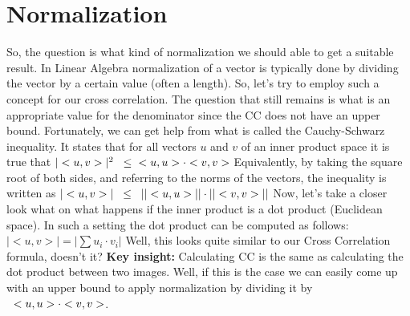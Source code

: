 \documentclass{article}
\begin{document}
\section{Normalization}
So, the question is what kind of normalization we should able to get a suitable result. In Linear Algebra normalization of a vector is typically done by dividing the vector by a certain value (often a length). So, let's try to employ such a concept for our cross correlation. The question that still remains is what is an appropriate value for the denominator since the CC does not have an upper bound.
\newline \newline
Fortunately, we can get help from what is called the Cauchy-Schwarz inequality. It states that for all vectors $u$ and $v$ of an inner product space it is true that
\newline \newline
$|<u,v>|^2 \hspace{0.2cm} \leq \hspace{0.2cm}<u,u> \cdot <v,v>$
\newline \newline
Equivalently, by taking the square root of both sides, and referring to the norms of the vectors, the inequality is written as
\newline \newline
$|<u,v>| \hspace{0.2cm} \leq \hspace{0.2cm} ||<u,u>|| \cdot ||<v,v>||$
\newline \newline
Now, let's take a closer look what on what happens if the inner product is a dot product (Euclidean space). In such a setting the dot product can be computed as follows:
\newline \newline
$|<u,v>| = |\sum u_i \cdot v_i|$
\newline \newline
Well, this looks quite similar to our Cross Correlation formula, doesn't it? 
\newline \newline
\textbf{Key insight:} Calculating CC is the same as calculating the dot product between two images.
\newline\newline
Well, if this is the case we can easily come up with an upper bound to apply normalization by dividing it by $\hspace{0.2cm}<u,u> \cdot <v,v>$.
\end{document}
